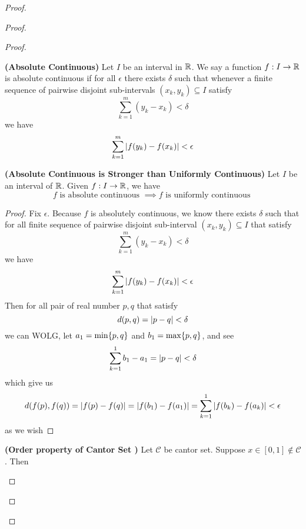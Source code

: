 \documentclass{report}
\begin{document}
\begin{proof}
\begin{proof}
\begin{proof}
\begin{definition}
\label{5.3.1}
\textbf{(Absolute Continuous)} Let $I$ be an interval in $\mathbb{R}$. We say a function $f: I\rightarrow \mathbb{R}$ is absolute continuous if for all $\epsilon $ there exists $\delta$ such that whenever a finite sequence of pairwise disjoint sub-intervals $(x_k,y_k)\subseteq I$ satisfy
\begin{equation*}
\sum_{k=1}^m (y_k-x_k)< \delta
\end{equation*}
we have 
\begin{equation*}
\sum_{k=1}^m |f(y_k)-f(x_k)|<\epsilon 
\end{equation*}
\end{definition}
\begin{theorem}
\label{5.3.2}
\textbf{(Absolute Continuous is Stronger than Uniformly Continuous)} Let $I$ be an interval of $\mathbb{R}$. Given  $f:I\rightarrow \mathbb{R}$, we have 
\begin{equation*}
f\text{ is absolute continuous }\implies f\text{ is uniformly continuous }
\end{equation*}
\end{theorem}
\begin{proof}
Fix $\epsilon $. Because $f$ is absolutely continuous, we know there exists  $\delta$ such that for all finite sequence of pairwise disjoint sub-interval $(x_k,y_k)\subseteq I$ that satisfy
\begin{equation*}
\sum_{k=1}^m (y_k-x_k)<\delta
\end{equation*}
we have 
\begin{equation*}
\sum_{k=1}^m |f(y_k)-f(x_k)|<\epsilon 
\end{equation*}
Then for all pair of real number $p,q$ that satisfy 
\begin{equation*}
d(p,q)=|p-q|<\delta
\end{equation*}
we can WOLG, let $a_1=\min  \{ p,q \}$  and $b_1=\max  \{ p,q \}$, and see
\begin{equation*}
  \sum_{k=1}^1 b_1-a_1=|p-q|<\delta
\end{equation*}
which give us 
\begin{equation*}
d(f(p),f(q))=|f(p)-f(q)|=|f(b_1)-f(a_1)|=\sum_{k=1}^1 |f(b_k)-f(a_k)|<\epsilon 
\end{equation*}
as we wish
\end{proof}
\begin{lemma}
\textbf{(Order property of Cantor Set )} Let $\mathcal{C}$ be cantor set. Suppose $x\in [0,1]\not\in \mathcal{C}$. Then 

\end{lemma}
\end{proof}
\end{proof}
\end{proof}
\end{document}
